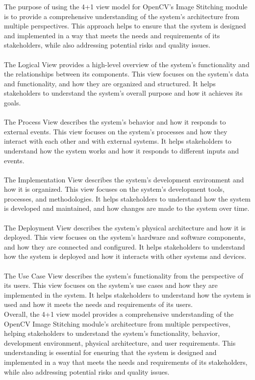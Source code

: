 \par{The purpose of using the 4+1 view model for OpenCV's Image Stitching module is to provide a comprehensive understanding of the system's architecture from multiple perspectives. This approach helps to ensure that the system is designed and implemented in a way that meets the needs and requirements of its stakeholders, while also addressing potential risks and quality issues. \\
\\
The Logical View provides a high-level overview of the system's functionality and the relationships between its components. This view focuses on the system's data and functionality, and how they are organized and structured. It helps stakeholders to understand the system's overall purpose and how it achieves its goals.\\
\\
The Process View describes the system's behavior and how it responds to external events. This view focuses on the system's processes and how they interact with each other and with external systems. It helps stakeholders to understand how the system works and how it responds to different inputs and events.\\
\\
The Implementation View describes the system's development environment and how it is organized. This view focuses on the system's development tools, processes, and methodologies. It helps stakeholders to understand how the system is developed and maintained, and how changes are made to the system over time.\\
\\
The Deployment View describes the system's physical architecture and how it is deployed. This view focuses on the system's hardware and software components, and how they are connected and configured. It helps stakeholders to understand how the system is deployed and how it interacts with other systems and devices.\\
\\
The Use Case View describes the system's functionality from the perspective of its users. This view focuses on the system's use cases and how they are implemented in the system. It helps stakeholders to understand how the system is used and how it meets the needs and requirements of its users.
\vspace{20pt}\\
Overall, the 4+1 view model provides a comprehensive understanding of the OpenCV Image Stitching module's architecture from multiple perspectives, helping stakeholders to understand the system's functionality, behavior, development environment, physical architecture, and user requirements. This understanding is essential for ensuring that the system is designed and implemented in a way that meets the needs and requirements of its stakeholders, while also addressing potential risks and quality issues.
}





